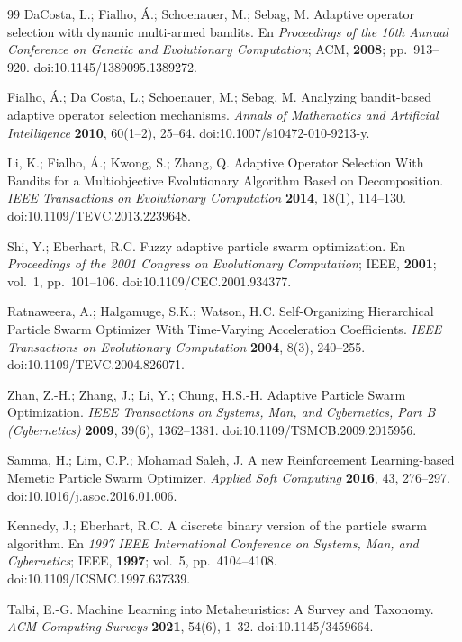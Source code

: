 \documentclass[10pt,a4paper]{article}
\begin{document}
\begin{thebibliography}{99}
 DaCosta, L.; Fialho, Á.; Schoenauer, M.; Sebag, M. Adaptive operator
selection with dynamic multi-armed bandits. En \emph{Proceedings of the 10th Annual Conference on
Genetic and Evolutionary Computation}; ACM, \textbf{2008}; pp.~913--920.
doi:10.1145/1389095.1389272.

 Fialho, Á.; Da Costa, L.; Schoenauer, M.; Sebag, M. Analyzing bandit-based
adaptive operator selection mechanisms. \emph{Annals of Mathematics and Artificial Intelligence}
\textbf{2010}, 60(1--2), 25--64. doi:10.1007/s10472-010-9213-y.

 Li, K.; Fialho, Á.; Kwong, S.; Zhang, Q. Adaptive Operator Selection With Bandits
for a Multiobjective Evolutionary Algorithm Based on Decomposition. \emph{IEEE Transactions on
Evolutionary Computation} \textbf{2014}, 18(1), 114--130. doi:10.1109/TEVC.2013.2239648.

 Shi, Y.; Eberhart, R.C. Fuzzy adaptive particle swarm optimization. En
\emph{Proceedings of the 2001 Congress on Evolutionary Computation}; IEEE, \textbf{2001}; vol.~1,
pp.~101--106. doi:10.1109/CEC.2001.934377.

 Ratnaweera, A.; Halgamuge, S.K.; Watson, H.C. Self-Organizing Hierarchical
Particle Swarm Optimizer With Time-Varying Acceleration Coefficients. \emph{IEEE Transactions on
Evolutionary Computation} \textbf{2004}, 8(3), 240--255. doi:10.1109/TEVC.2004.826071.

 Zhan, Z.-H.; Zhang, J.; Li, Y.; Chung, H.S.-H. Adaptive Particle Swarm
Optimization. \emph{IEEE Transactions on Systems, Man, and Cybernetics, Part B (Cybernetics)}
\textbf{2009}, 39(6), 1362--1381. doi:10.1109/TSMCB.2009.2015956.

 Samma, H.; Lim, C.P.; Mohamad Saleh, J. A new Reinforcement Learning-based
Memetic Particle Swarm Optimizer. \emph{Applied Soft Computing} \textbf{2016}, 43, 276--297.
doi:10.1016/j.asoc.2016.01.006.

 Kennedy, J.; Eberhart, R.C. A discrete binary version of the particle swarm
algorithm. En \emph{1997 IEEE International Conference on Systems, Man, and Cybernetics}; IEEE,
\textbf{1997}; vol.~5, pp.~4104--4108. doi:10.1109/ICSMC.1997.637339.

 Talbi, E.-G. Machine Learning into Metaheuristics: A Survey and Taxonomy.
\emph{ACM Computing Surveys} \textbf{2021}, 54(6), 1--32. doi:10.1145/3459664.


\end{thebibliography}
\end{document}

